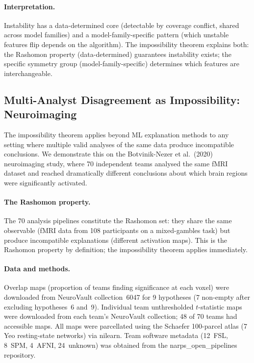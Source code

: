 \documentclass[11pt,a4paper]{article}
\begin{document}
\paragraph{Interpretation.}
Instability has a data-determined core (detectable by coverage conflict, shared across model families) and a model-family-specific pattern (which unstable features flip depends on the algorithm).  The impossibility theorem explains both: the Rashomon property (data-determined) guarantees instability exists; the specific symmetry group (model-family-specific) determines which features are interchangeable.

\subsection{Multi-Analyst Disagreement as Impossibility: Neuroimaging}
\label{sec:narps}

The impossibility theorem applies beyond ML explanation methods to any setting where multiple valid analyses of the same data produce incompatible conclusions.  We demonstrate this on the Botvinik-Nezer et al.\ (2020) neuroimaging study, where 70 independent teams analysed the same fMRI dataset and reached dramatically different conclusions about which brain regions were significantly activated.

\paragraph{The Rashomon property.}
The 70 analysis pipelines constitute the Rashomon set: they share the same observable (fMRI data from 108 participants on a mixed-gambles task) but produce incompatible explanations (different activation maps).  This is the Rashomon property by definition; the impossibility theorem applies immediately.

\paragraph{Data and methods.}
Overlap maps (proportion of teams finding significance at each voxel) were downloaded from NeuroVault collection~6047 for 9 hypotheses (7 non-empty after excluding hypotheses~6 and~9).  Individual team unthresholded $t$-statistic maps were downloaded from each team's NeuroVault collection; 48 of 70 teams had accessible maps.  All maps were parcellated using the Schaefer 100-parcel atlas (7 Yeo resting-state networks) via nilearn.  Team software metadata (12~FSL, 8~SPM, 4~AFNI, 24~unknown) was obtained from the narps\_open\_pipelines repository.
\end{document}
